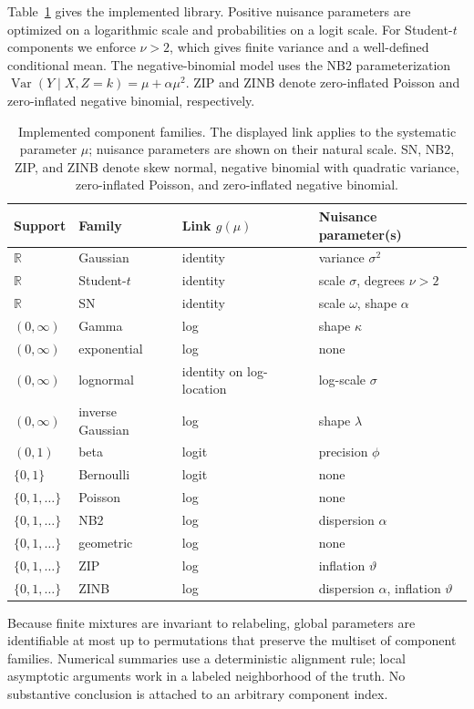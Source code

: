 \documentclass[a4paper,fleqn]{cas-sc}
\DeclareMathOperator{\Var}{Var}
\newcommand{\R}{\mathbb R}
\begin{document}
Table~\ref{tab:family-library} gives the implemented library. Positive nuisance parameters are optimized on a logarithmic scale and probabilities on a logit scale. For Student-$t$ components we enforce $\nu>2$, which gives finite variance and a well-defined conditional mean. The negative-binomial model uses the NB2 parameterization $\Var(Y\mid X,Z=k)=\mu+\alpha\mu^2$. ZIP and ZINB denote zero-inflated Poisson and zero-inflated negative binomial, respectively.

\begin{table}[t]
\centering
\caption{Implemented component families. The displayed link applies to the systematic parameter $\mu$; nuisance parameters are shown on their natural scale. SN, NB2, ZIP, and ZINB denote skew normal, negative binomial with quadratic variance, zero-inflated Poisson, and zero-inflated negative binomial.}
\label{tab:family-library}
\small
\begin{tabular}{llll}
\toprule
Support & Family & Link $g(\mu)$ & Nuisance parameter(s) \\
\midrule
$\R$ & Gaussian & identity & variance $\sigma^2$ \\
$\R$ & Student-$t$ & identity & scale $\sigma$, degrees $\nu>2$ \\
$\R$ & SN & identity & scale $\omega$, shape $\alpha$ \\
$(0,\infty)$ & Gamma & log & shape $\kappa$ \\
$(0,\infty)$ & exponential & log & none \\
$(0,\infty)$ & lognormal & identity on log-location & log-scale $\sigma$ \\
$(0,\infty)$ & inverse Gaussian & log & shape $\lambda$ \\
$(0,1)$ & beta & logit & precision $\phi$ \\
$\{0,1\}$ & Bernoulli & logit & none \\
$\{0,1,\ldots\}$ & Poisson & log & none \\
$\{0,1,\ldots\}$ & NB2 & log & dispersion $\alpha$ \\
$\{0,1,\ldots\}$ & geometric & log & none \\
$\{0,1,\ldots\}$ & ZIP & log & inflation $\vartheta$ \\
$\{0,1,\ldots\}$ & ZINB & log & dispersion $\alpha$, inflation $\vartheta$ \\
\bottomrule
\end{tabular}
\end{table}

Because finite mixtures are invariant to relabeling, global parameters are identifiable at most up to permutations that preserve the multiset of component families. Numerical summaries use a deterministic alignment rule; local asymptotic arguments work in a labeled neighborhood of the truth. No substantive conclusion is attached to an arbitrary component index.
\end{document}

